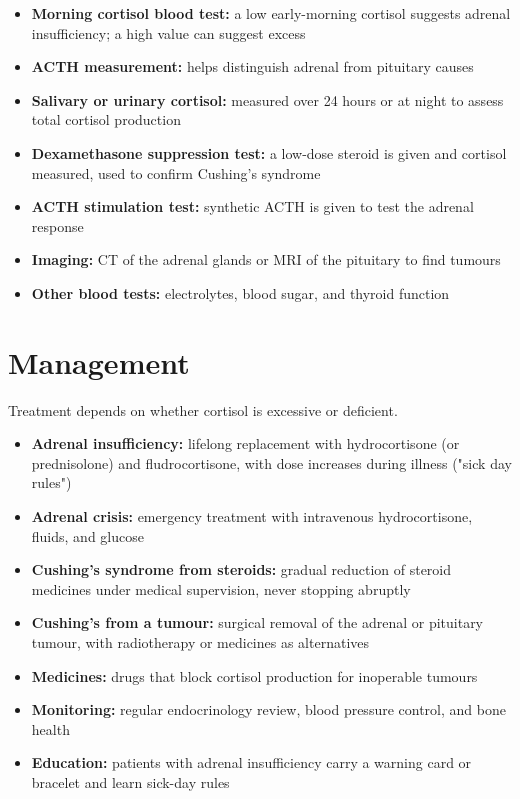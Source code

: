 \begin{itemize}
    \item \textbf{Morning cortisol blood test:} a low early-morning cortisol suggests adrenal insufficiency; a high value can suggest excess
    \item \textbf{ACTH measurement:} helps distinguish adrenal from pituitary causes
    \item \textbf{Salivary or urinary cortisol:} measured over 24 hours or at night to assess total cortisol production
    \item \textbf{Dexamethasone suppression test:} a low-dose steroid is given and cortisol measured, used to confirm Cushing's syndrome
    \item \textbf{ACTH stimulation test:} synthetic ACTH is given to test the adrenal response
    \item \textbf{Imaging:} CT of the adrenal glands or MRI of the pituitary to find tumours
    \item \textbf{Other blood tests:} electrolytes, blood sugar, and thyroid function
\end{itemize}

\section*{Management}
Treatment depends on whether cortisol is excessive or deficient.

\begin{itemize}
    \item \textbf{Adrenal insufficiency:} lifelong replacement with hydrocortisone (or prednisolone) and fludrocortisone, with dose increases during illness ("sick day rules")
    \item \textbf{Adrenal crisis:} emergency treatment with intravenous hydrocortisone, fluids, and glucose
    \item \textbf{Cushing's syndrome from steroids:} gradual reduction of steroid medicines under medical supervision, never stopping abruptly
    \item \textbf{Cushing's from a tumour:} surgical removal of the adrenal or pituitary tumour, with radiotherapy or medicines as alternatives
    \item \textbf{Medicines:} drugs that block cortisol production for inoperable tumours
    \item \textbf{Monitoring:} regular endocrinology review, blood pressure control, and bone health
    \item \textbf{Education:} patients with adrenal insufficiency carry a warning card or bracelet and learn sick-day rules
\end{itemize}

